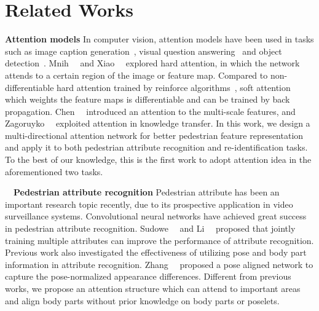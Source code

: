 \documentclass[10pt,twocolumn,letterpaper]{article}
\begin{document}
\section{Related Works}
\label{sec:related_work}


\noindent \textbf{Attention models}
In computer vision, attention models have been used in tasks such as image caption generation~\cite{xu2015show}, visual question answering~\cite{lu2016hierarchical,xu2016ask} and object detection~\cite{ba2014multiple}.
Mnih~\etal~\cite{mnih2014recurrent} and Xiao~\etal~\cite{xiao2015application} explored hard attention, in which the network attends to a certain region of the image or feature map.
Compared to non-differentiable hard attention trained by reinforce algorithms~\cite{williams1992simple}, soft attention which weights the feature maps is differentiable and can be trained by back propagation.
Chen~\etal~\cite{chen2016attention} introduced an attention to the multi-scale features, and Zagoruyko~\etal~\cite{zagoruyko2016paying} exploited attention in knowledge transfer. In this work, we design a multi-directional attention network for better pedestrian feature representation and apply it to both pedestrian attribute recognition and re-identification tasks. To the best of our knowledge, this is the first work to adopt attention idea in the aforementioned two tasks.

\noindent　\textbf{Pedestrian attribute recognition}
Pedestrian attribute has been an important research topic recently, due to its prospective application in video surveillance systems. Convolutional neural networks have achieved great success in pedestrian attribute recognition. Sudowe~\etal~\cite{sudowe2015person} and Li~\etal~\cite{li2015multi} proposed that jointly training multiple attributes can improve the performance of attribute recognition.
Previous work also investigated the effectiveness of utilizing pose and body part information in attribute recognition.
Zhang~\etal~\cite{zhang2014panda} proposed a pose aligned network to capture the pose-normalized appearance differences.
Different from previous works, we propose an attention structure which can attend to important areas and align body parts without prior knowledge on body parts or poselets.
\end{document}
